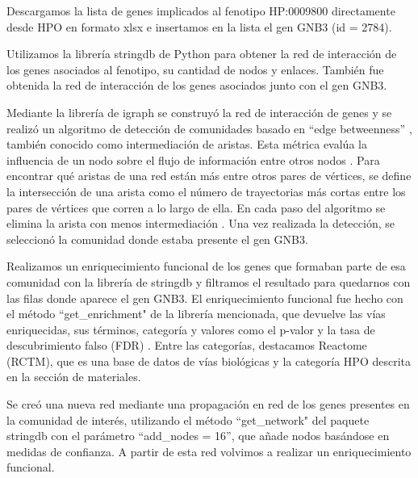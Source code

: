 Descargamos la lista de genes implicados al fenotipo HP:0009800 directamente desde HPO en formato xlsx e insertamos en la lista el gen GNB3 (id = 2784).

Utilizamos la librería stringdb de Python para obtener la red de interacción de los genes asociados al fenotipo, su cantidad de nodos y enlaces. También fue obtenida la red de interacción de los genes asociados junto con el gen GNB3.

Mediante la librería de igraph se construyó la red de interacción de genes y se realizó un algoritmo de detección de comunidades basado en ``edge betweenness'' \cite{Girvan2002}, también conocido como intermediación de aristas. Esta métrica evalúa la influencia de un nodo sobre el flujo de información entre otros nodos  \cite{Girvan2002}. Para encontrar qué aristas de una red están más entre otros pares de vértices, se define la intersección de una arista como el número de trayectorias más cortas entre los pares de vértices que corren a lo largo de ella. En cada paso del algoritmo se elimina la arista con menos intermediación  \cite{Girvan2002}. Una vez realizada la detección, se seleccionó la comunidad donde estaba presente el gen GNB3.

Realizamos un enriquecimiento funcional de los genes que formaban parte de esa comunidad con la librería de stringdb y filtramos el resultado para quedarnos con las filas donde aparece el gen GNB3. El enriquecimiento funcional fue hecho con el método ``get\_enrichment" de la librería mencionada, que devuelve las vías enriquecidas, sus términos, categoría y  valores como el p-valor y la tasa de descubrimiento falso (FDR) . Entre las categorías, destacamos Reactome (RCTM), que es una base de datos de vías biológicas \cite{Gillespie2021} y la categoría HPO \cite{Kohler2017} descrita en la sección de materiales.

Se creó una nueva red mediante una propagación en red de los genes presentes en la comunidad de interés, utilizando el método ``get\_network" del paquete stringdb con el parámetro ``add\_nodes = 16'', que añade nodos basándose en medidas de confianza. A partir de esta red volvimos a realizar un enriquecimiento funcional.